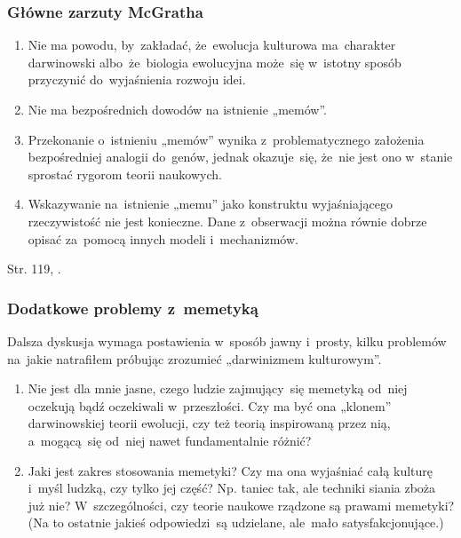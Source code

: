\documentclass[10pt,t]{beamer}
\begin{document}
\begin{frame}
  \frametitle{Główne zarzuty McGratha}


  \begin{enumerate}

  \item Nie ma powodu, by~zakładać, że~ewolucja kulturowa
    ma~charakter darwinowski albo~że~biologia ewolucyjna może~się
    w~istotny sposób przyczynić do~wyjaśnienia rozwoju idei.

  \item Nie ma bezpośrednich dowodów na istnienie „memów”.

  \item Przekonanie o~istnieniu „memów” wynika z~problematycznego
    założenia bezpośredniej analogii do~genów, jednak okazuje~się,
    że~nie jest ono w~stanie sprostać rygorom teorii naukowych.

  \item Wskazywanie na~istnienie „memu” jako konstruktu
    wyjaśniającego rzeczywistość nie jest konieczne. Dane
    z~obserwacji można równie dobrze opisać za~pomocą innych modeli
    i~mechanizmów.

  \end{enumerate}

  Str. 119, \cite{McGrathBogDawkinsa2008}.

\end{frame}





\begin{frame}
  \frametitle{Dodatkowe problemy z~memetyką}


  Dalsza dyskusja wymaga postawienia w~sposób jawny i~prosty, kilku
  problemów na~jakie natrafiłem próbując zrozumieć „darwinizmem
  kulturowym”.

  \begin{enumerate}

  \item Nie jest dla mnie jasne, czego ludzie zajmujący~się memetyką
    od~niej oczekują bądź oczekiwali w~przeszłości. Czy ma być ona „klonem”
    darwinowskiej teorii ewolucji, czy też teorią inspirowaną przez
    nią, a~mogącą~się od~niej nawet fundamentalnie różnić?

  \item Jaki jest zakres stosowania memetyki? Czy ma ona wyjaśniać
    całą kulturę i~myśl ludzką, czy tylko jej część? Np. taniec tak,
    ale techniki siania zboża już nie? W~szczególności, czy teorie
    naukowe rządzone są prawami memetyki? (Na to ostatnie jakieś
    odpowiedzi~są udzielane, ale~mało satysfakcjonujące.)

  \end{enumerate}

\end{frame}
\end{document}
